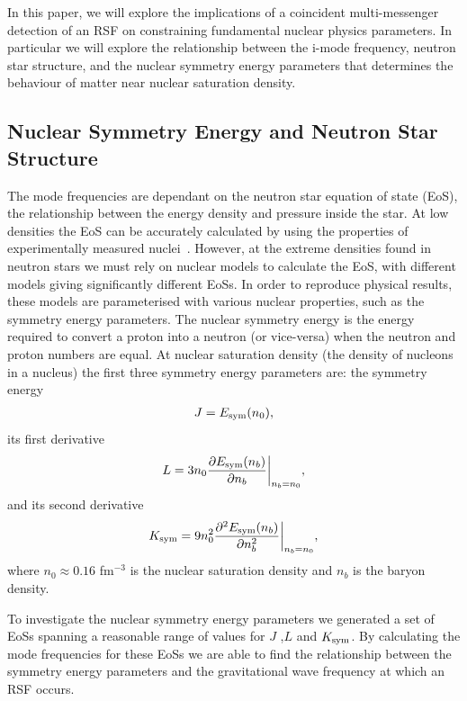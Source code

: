 \documentclass[fleqn,usenatbib]{mnras}
\begin{document}
In this paper, we will explore the implications of a coincident multi-messenger detection of an RSF on constraining fundamental nuclear physics parameters. In particular we will explore the relationship between the i-mode frequency, neutron star structure, and the nuclear symmetry energy parameters that determines the behaviour of matter near nuclear saturation density. 







\subsection{Nuclear Symmetry Energy and Neutron Star Structure}
\hspace{\parindent}The mode frequencies are dependant on the neutron star equation of state (EoS), the relationship between the energy density and pressure inside the star. At low densities the EoS can be accurately calculated by using the properties of experimentally measured nuclei~\citet{baym1971ground}. However, at the extreme densities found in neutron stars we must rely on nuclear models to calculate the EoS, with different models giving significantly different EoSs. In order to reproduce physical results, these models are parameterised with various nuclear properties, such as the symmetry energy parameters. The nuclear symmetry energy is the energy required to convert a proton into a neutron (or vice-versa) when the neutron and proton numbers are equal. At nuclear saturation density (the density of nucleons in a nucleus) the first three symmetry energy parameters are: the symmetry energy
\begin{align}
J=E_{\rm sym}(n_0),    
\label{eq:sym_J}
\end{align}
\noindent its first derivative 
\begin{align}
L=3n_0\frac{\partial E_{\rm sym}(n_b)}{\partial n_b}\biggr\rvert_{n_b=n_0},  
\label{eq:sym_L}
\end{align}
\noindent and its second derivative
\begin{align}
K_{\rm sym}=9n_0^2\frac{\partial^2 E_{\rm sym}(n_b)}{\partial n_b^2}\biggr\rvert_{n_b=n_0},
\label{eq:sym_K}
\end{align}
\noindent where $n_0\approx 0.16$ fm$^{-3}$ is the nuclear saturation density and $n_b$ is the baryon density.

\hspace{\parindent}To investigate the nuclear symmetry energy parameters we generated a set of EoSs spanning a reasonable range of values for $J$ ,$L$ and $K_{\rm sym}$. By calculating the mode frequencies for these EoSs we are able to find the relationship between the symmetry energy parameters and the gravitational wave frequency at which an RSF occurs.
\end{document}
